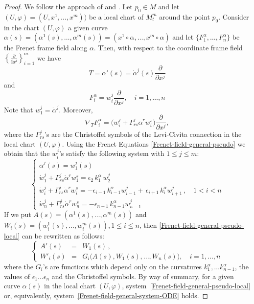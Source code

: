 \documentclass[11pt]{amsart}
\theoremstyle{plain}
\theoremstyle{definition}
\numberwithin{equation}{section}
\begin{document}
\begin{proof} 
We follow the approach of \cite{MR3198740} and \cite{Spivak}. Let $p_0\in M$ and let $( U, \varphi) = (U, x^1,  \ldots, x^m) )$ be a local chart of $M_t^m$ around the point $p_0$.
Consider in the chart $( U, \varphi)$ a given curve $\alpha(s) = (\alpha^1(s), \ldots, \alpha^m(s)) = (x^1 \circ \alpha, \ldots, x^m \circ \alpha)$ and let $\{ F_1^\alpha, \ldots, F_n^\alpha \}$ be the Frenet frame field along $\alpha$. Then, with respect to the coordinate frame field $\left\lbrace\frac{\partial}{\partial x^i} \right\rbrace_{i = 1}^m$ we have
\[
T = \alpha'(s) = \dot{\alpha}^j(s) \dfrac{\partial}{\partial x^j}
\]
and
\[
F_i^\alpha = w_i^j \dfrac{\partial}{\partial x^j},\quad i=1, \dots, n
\] 
 Note that $w_1^j =\dot{\alpha}^j$.
Moreover, 
\[
\nabla_T F_i^\alpha = \big( \dot{w}_i^j + \Gamma_{rs}^j \dot{\alpha}^r w_i^s \big)\dfrac{\partial}{\partial x^j},
\]
where the $\Gamma_{rs}^j$'s are the Christoffel symbols of the Levi-Civita connection in the local chart $( U, \varphi)$.
Using the Frenet Equations \eqref{Frenet-field-general-pseudo} we obtain that the $ w_i^j$'s satisfy the following system with $1\leq j\leq m$:
\begin{equation}\label{Frenet-field-general-pseudo-local}
\begin{cases}
\dot{\alpha}^j(s)=w_1^j(s) \\ 
 \dot{w}_1^j + \Gamma_{rs}^j \dot{\alpha}^r w_1^s= \epsilon_2 \,k_1^\alpha\,w_2^j  \\ 
\dot{w}_i^j + \Gamma_{rs}^j \dot{\alpha}^r w_i^s=-\epsilon_{i-1}\,k_{i-1}^\alpha w_{i-1}^j+\,\epsilon_{i+1}\,k_i^\alpha w_{i+1}^j \,,  \quad 1<i<n\\ 
\dot{w}_n^j + \Gamma_{rs}^j \dot{\alpha}^r w_n^s=-\epsilon_{n-1}\,k_{n-1}^\alpha w_{n-1}^j 
\end{cases} 
\end{equation}
If we put  $A(s) = (\alpha^1(s),  \dots, \alpha^m(s))$ and $W_i(s) = (w_i^1(s),  \dots, w_i^m(s)), 1 \leq i \leq n$, then \eqref{Frenet-field-general-pseudo-local} can be rewritten as follows:
\begin{equation}\label{Frenet-field-general-system-ODE}
\left \{
\begin{array}{ccl}
A'(s)&=&W_1(s)\,, \\[1 ex]
W'_i(s) &=& G_i\big(A(s), W_1(s), ..., W_n(s)\big),\quad  i=1,  \dots, n
\end{array} \right .
\end{equation}
where the $G_i$'s are functions which depend only on the curvatures $k_1^\alpha, \dots k_{n-1}^\alpha$, the values of $\epsilon_1 \dots \epsilon_n$ and the Christoffel symbols. 
By way of summary, for a given curve $\alpha(s)$ in the local chart $( U, \varphi)$, system~\ref{Frenet-field-general-pseudo-local} or, equivalently, system~\ref{Frenet-field-general-system-ODE} holds. 


\end{proof}
\end{document}
